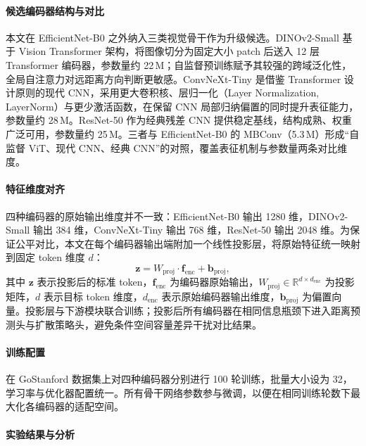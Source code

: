 \paragraph*{候选编码器结构与对比}

本文在 EfficientNet-B0 之外纳入三类视觉骨干作为升级候选。DINOv2-Small\cite{dinov2_2023} 基于 Vision Transformer 架构，将图像切分为固定大小 patch 后送入 12 层 Transformer 编码器，参数量约 22\,M；自监督预训练赋予其较强的跨域泛化性，全局自注意力对远距离方向判断更敏感。ConvNeXt-Tiny\cite{convnext2022} 是借鉴 Transformer 设计原则的现代 CNN，采用更大卷积核、层归一化（Layer Normalization, LayerNorm）与更少激活函数，在保留 CNN 局部归纳偏置的同时提升表征能力，参数量约 28\,M。ResNet-50\cite{resnet2016} 作为经典残差 CNN 提供稳定基线，结构成熟、权重广泛可用，参数量约 25\,M。三者与 EfficientNet-B0 的 MBConv（5.3\,M）形成``自监督 ViT、现代 CNN、经典 CNN''的对照，覆盖表征机制与参数量两条对比维度。

\paragraph*{特征维度对齐}

四种编码器的原始输出维度并不一致：EfficientNet-B0 输出 1280 维，DINOv2-Small 输出 384 维，ConvNeXt-Tiny 输出 768 维，ResNet-50 输出 2048 维。为保证公平对比，本文在每个编码器输出端附加一个线性投影层，将原始特征统一映射到固定 token 维度 $d$：
\begin{equation}
\mathbf{z} = W_{\text{proj}} \cdot \mathbf{f}_{\text{enc}} + \mathbf{b}_{\text{proj}},
\end{equation}
其中 $\mathbf{z}$ 表示投影后的标准 token，$\mathbf{f}_{\text{enc}}$ 为编码器原始输出，$W_{\text{proj}} \in \mathbb{R}^{d \times d_{\text{enc}}}$ 为投影矩阵，$d$ 表示目标 token 维度，$d_{\text{enc}}$ 表示原始编码器输出维度，$\mathbf{b}_{\text{proj}}$ 为偏置向量。投影层与下游模块联合训练；投影后所有编码器在相同信息瓶颈下进入距离预测头与扩散策略头，避免条件空间容量差异干扰对比结果。


\paragraph*{训练配置}

在 GoStanford 数据集上对四种编码器分别进行 100 轮训练，批量大小设为 32，学习率与优化器配置统一。所有骨干网络参数参与微调，以便在相同训练轮数下最大化各编码器的适配空间。

\paragraph*{实验结果与分析}

